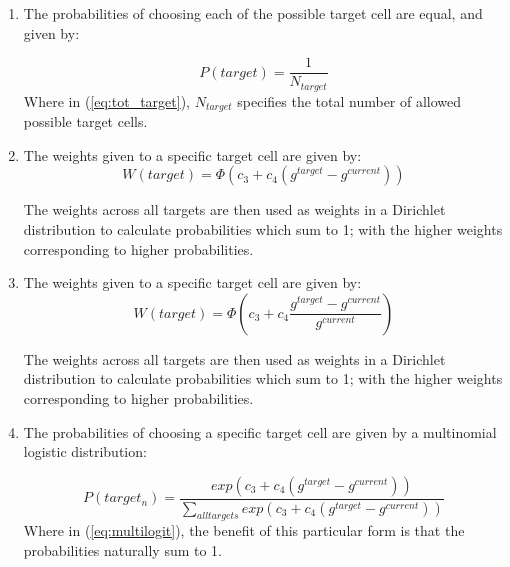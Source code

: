 \documentclass[pdftex,10pt,a4paper]{article}
\begin{document}
\begin{enumerate}
\item The probabilities of choosing each of the possible target cell are equal, and given by:

\begin{equation}\label{eq:tot_target}
P(target) = \frac{1}{N_{target}} 
\end{equation}
Where in (\ref{eq:tot_target}), $N_{target}$ specifies the total number of allowed possible target cells.

\item The weights given to a specific target cell are given by:
\begin{equation}
W(target) = \Phi (c_3 + c_4(g^{target} - g^{current}))
\end{equation}

The weights across all targets are then used as weights in a Dirichlet distribution to calculate probabilities which sum to 1; with the higher weights corresponding to higher probabilities.

\item The weights given to a specific target cell are given by:
\begin{equation}
W(target) = \Phi (c_3 + c_4\frac{g^{target} - g^{current}}{g^{current}})
\end{equation}

The weights across all targets are then used as weights in a Dirichlet distribution to calculate probabilities which sum to 1; with the higher weights corresponding to higher probabilities.

\item The probabilities of choosing a specific target cell are given by a multinomial logistic distribution:

\begin{equation} \label{eq:multilogit}
P(target_n) = \frac{exp(c_3 + c_4(g^{target} - g^{current}))}{\sum\limits_{all targets} exp(c_3 + c_4(g^{target} - g^{current}))}
\end{equation}
Where in (\ref{eq:multilogit}), the benefit of this particular form is that the probabilities naturally sum to 1.

\end{enumerate}
\end{document}
